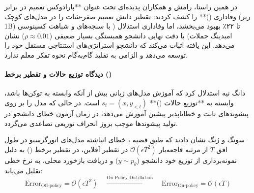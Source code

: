 در همین راستا، رامش و همکاران \cite{ramesh2025generalization} پدیده‌ای تحت عنوان **پارادوکس تعمیم در برابر وفاداری ()** را کشف کردند: تقطیر دانش تعمیم صفر-شات را در مدل‌های کوچک (زیر 1B) تا ۲۲٪ بهبود می‌بخشد، اما وفاداری استدلال ( با سنجه‌های  و شباهت کسینوسی امبدینگ جملات) با دقت نهایی دانشجو همبستگی بسیار ضعیفی ($\rho \approx 0.01$) نشان می‌دهد. این یافته اثبات می‌کند که دانشجو استراتژی‌های استنتاجی مستقل خود را توسعه می‌دهد و الزامی به تقلید گام‌به‌گام نحوه تفکر معلم ندارد.

\paragraph*{دیدگاه توزیع حالات و تقطیر برخط ()}
دانگ نیه \cite{nie2026post} استدلال کرد که آموزش مدل‌های زبانی بیش از آنکه وابسته به توکن‌ها باشد، وابسته به **توزیع حالات ()** $s_t = (x, y_{<t})$ است. در حالی که  مدل را بر روی پیشوندهای ثابت و خطاناپذیر پیشین آموزش می‌دهد، در زمان آزمون خطای دانشجو در تولید پیشوندها موجب بروز انحراف توزیعی تصاعدی می‌گردد. 

سونگ و ژنگ \cite{song2026survey} نشان دادند که طبق قضیه  \cite{ross2011reduction}، خطای انباشته مدل‌های اتورگرسیو در طول افق $T$ از مرتبه فاجعه‌بار $\mathcal{O}(\epsilon T^2)$ در تقطیر آفلاین، در تقطیر برخط () به دلیل نمونه‌برداری از توزیع خود دانشجو ($y \sim p_\theta$) و دریافت بازخورد محلی، به نرخ خطی تقلیل می‌یابد:
\begin{equation}
    \text{Error}_{\text{Off-policy}} = \mathcal{O}(\epsilon T^2) \quad \xrightarrow{\text{On-Policy Distillation}} \quad \text{Error}_{\text{On-policy}} = \mathcal{O}(\epsilon T)
\end{equation}

